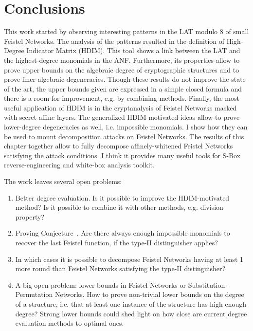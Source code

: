 \section{Conclusions}

This work started by observing interesting patterns in the LAT modulo 8 of small Feistel Networks. The analysis of the patterns resulted in the definition of High-Degree Indicator Matrix (HDIM). This tool shows a link between the LAT and the highest-degree monomials in the ANF. Furthermore, its properties allow to prove upper bounds on the algebraic degree of cryptographic structures and to prove finer algebraic degeneracies. Though these results do not improve the state of the art, the upper bounds given are expressed in a simple closed formula and there is a room for improvement, e.g. by combining methods. Finally, the most useful application of HDIM is in the cryptanalysis of Feistel Networks masked with secret affine layers. The generalized HDIM-motivated ideas allow to prove lower-degree degeneracies as well, i.e. impossible monomials. I show how they can be used to mount decomposition attacks on Feistel Networks. The results of this chapter together allow to fully decompose affinely-whitened Feistel Networks satisfying the attack conditions. I think it provides many useful tools for S-Box reverse-engineering and white-box analysis toolkit.

The work leaves several open problems:
\begin{enumerate}
    \item Better degree evaluation. Is it possible to improve the HDIM-motivated method? Is it possible to combine it with other methods, e.g. division property?  
    
    \item Proving Conjecture~. Are there always enough impossible monomials to recover the last Feistel function, if the type-II distinguisher applies?

    \item In which cases it is possible to decompose Feistel Networks having at least 1 more round than Feistel Networks satisfying the type-II distinguisher?
    
    \item A big open problem: lower bounds in Feistel Networks or Substitution-Permutation Networks. How to prove non-trivial lower bounds on the degree of a structure, i.e. that at least one instance of the structure has high enough degree? Strong lower bounds could shed light on how close are current degree evaluation methods to optimal ones.
\end{enumerate}